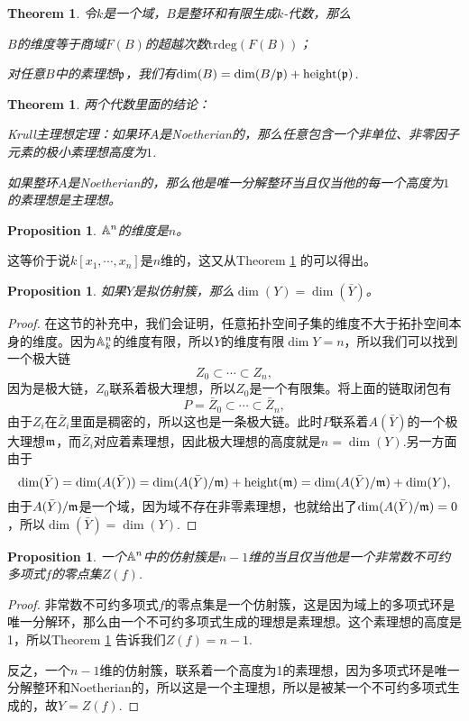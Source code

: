 \documentclass[9pt]{extarticle}
\theoremstyle{plain}%
\newtheorem{pro}[defi]{Proposition}%
\newtheorem{theo}[defi]{Theorem}%
\begin{document}
\begin{theo}
令$k$是一个域，$B$是整环和有限生成$k$-代数，那么

 $B$的维度等于商域$F(B)$的超越次数$\mathrm{trdeg}(F(B))$；

 对任意$B$中的素理想$\mathfrak{p}$，我们有$\dim (B)=\dim (B/\mathfrak{p}) +\operatorname{height}(\mathfrak{p}) $.
\label{t1.2}
\end{theo}
\begin{theo}两个代数里面的结论：

Krull主理想定理：如果环$A$是Noetherian的，那么任意包含一个非单位、非零因子元素的极小素理想高度为$1$.

如果整环$A$是Noetherian的，那么他是唯一分解整环当且仅当他的每一个高度为$1$的素理想是主理想。
\end{theo}
\begin{pro}
$\mathbb{A}^n$的维度是$n$。
\end{pro}
这等价于说$k[x_1,\cdots, x_n]$是$n$维的，这又从Theorem \ref{t1.2} 的可以得出。

\begin{pro}
如果$Y$是拟仿射簇，那么$\dim(Y)=\dim(\bar{Y})$。
\end{pro}
\begin{proof}在这节的补充中，我们会证明，任意拓扑空间子集的维度不大于拓扑空间本身的维度。因为$\mathbb{A}^n_k$的维度有限，所以$Y$的维度有限$\dim Y=n$，所以我们可以找到一个极大链
\[
	Z_0\subset \cdots \subset Z_n,
\]
因为是极大链，$Z_0$联系着极大理想，所以$Z_0$是一个有限集。将上面的链取闭包有
\[
	P=\bar{Z}_0\subset \cdots \subset \bar{Z}_n,
\]
由于$Z_i$在$\bar{Z}_i$里面是稠密的，所以这也是一条极大链。此时$P$联系着$A(\bar{Y})$的一个极大理想$\mathfrak{m}$，而$\bar{Z}_i$对应着素理想，因此极大理想的高度就是$n=\dim(Y)$.另一方面由于
\[
	\dim (\bar{Y})=\dim (A(\bar{Y}))=\dim (A(\bar{Y})/\mathfrak{m}) +\operatorname{height}(\mathfrak{m})=\dim (A(\bar{Y})/\mathfrak{m}) +\dim(Y),
\]
由于$A(\bar{Y})/\mathfrak{m}$是一个域，因为域不存在非零素理想，也就给出了$\dim (A(\bar{Y})/\mathfrak{m})=0$，所以$\dim (\bar{Y})=\dim(Y)$.
\end{proof}
\begin{pro}
一个$\mathbb{A}^n$中的仿射簇是$n-1$维的当且仅当他是一个非常数不可约多项式$f$的零点集$Z(f)$.
\end{pro}
\begin{proof}
非常数不可约多项式$f$的零点集是一个仿射簇，这是因为域上的多项式环是唯一分解环，那么由一个不可约多项式生成的理想是素理想。这个素理想的高度是1，所以Theorem \ref{t1.2} 告诉我们$Z(f)=n-1$.

反之，一个$n-1$维的仿射簇，联系着一个高度为1的素理想，因为多项式环是唯一分解整环和Noetherian的，所以这是一个主理想，所以是被某一个不可约多项式生成的，故$Y=Z(f)$.
\end{proof}
\end{document}
